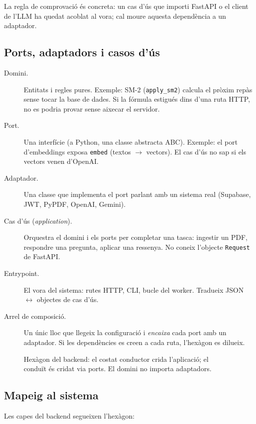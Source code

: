 La regla de comprovació és concreta: un cas d'ús que importi FastAPI o el client de l'LLM ha quedat acoblat al vora; cal moure aquesta dependència a un adaptador.

\subsection{Ports, adaptadors i casos d'ús}

\begin{description}
  \item[Domini.] Entitats i regles pures. Exemple: SM-2 (\texttt{apply\_sm2}) calcula el pròxim repàs sense tocar la base de dades. Si la fórmula estigués dins d'una ruta HTTP, no es podria provar sense aixecar el servidor.
  \item[Port.] Una interfície (a Python, una classe abstracta ABC). Exemple: el port d'embeddings exposa \texttt{embed} (textos $\rightarrow$ vectors). El cas d'ús no sap si els vectors venen d'OpenAI.
  \item[Adaptador.] Una classe que implementa el port parlant amb un sistema real (Supabase, JWT, PyPDF, OpenAI, Gemini).
  \item[Cas d'ús (\emph{application}).] Orquestra el domini i els ports per completar una tasca: ingestir un PDF, respondre una pregunta, aplicar una ressenya. No coneix l'objecte \texttt{Request} de FastAPI.
  \item[Entrypoint.] El vora del sistema: rutes HTTP, CLI, bucle del worker. Tradueix JSON $\leftrightarrow$ objectes de cas d'ús.
  \item[Arrel de composició.] Un únic lloc que llegeix la configuració i \emph{encaixa} cada port amb un adaptador. Si les dependències es creen a cada ruta, l'hexàgon es dilueix.
\end{description}

\begin{figure}[htbp]
\centering

\caption{Hexàgon del backend: el costat conductor crida l'aplicació; el conduït és cridat via ports. El domini no importa adaptadors.}
\label{fig:hex}
\end{figure}

\subsection{Mapeig al sistema}
\label{sec:hex-map}

Les capes del backend segueixen l'hexàgon:


